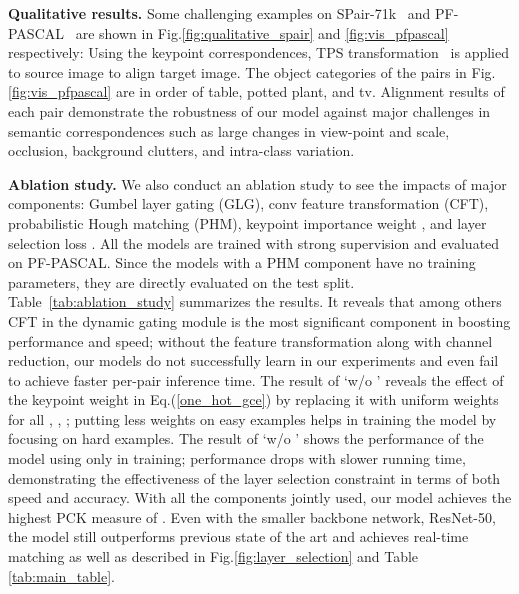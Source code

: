 \documentclass[runningheads]{llncs}
\begin{document}
\smallbreak
\noindent \textbf{Qualitative results.}
Some challenging examples on SPair-71k~\cite{min2019spair} and PF-PASCAL~\cite{ham2018proposal} are shown in Fig.\ref{fig:qualitative_spair} and \ref{fig:vis_pfpascal} respectively: Using the keypoint correspondences, TPS transformation~\cite{donato2002approximate} is applied to source image to align target image.
The object categories of the pairs in Fig.\ref{fig:vis_pfpascal} are in order of table, potted plant, and tv.
Alignment results of each pair demonstrate the robustness of our model against major challenges in semantic correspondences such as large changes in view-point and scale, occlusion, background clutters, and intra-class variation.

\smallbreak
\noindent \textbf{Ablation study.}
We also conduct an ablation study to see the impacts of major components: Gumbel layer gating (GLG), conv feature transformation (CFT), probabilistic Hough matching (PHM), keypoint importance weight , and layer selection loss .
All the models are trained with strong supervision and evaluated on PF-PASCAL. 
Since the models with a PHM component have no training parameters, they are directly evaluated on the test split.
Table~\ref{tab:ablation_study} summarizes the results. 
It reveals that among others CFT in the dynamic gating module is the most significant component in boosting performance and speed; without the feature transformation along with channel reduction, our models do not successfully learn in our experiments and even fail to achieve faster per-pair inference time.
The result of `w/o ' reveals the effect of the keypoint weight  in  Eq.(\ref{one_hot_gce}) by replacing it with uniform weights for all , \ie, ; putting less weights on easy examples helps in training the model by focusing on hard examples.
The result of `w/o ' shows the performance of the model using  only in training; performance drops with slower running time, demonstrating the effectiveness of the layer selection constraint in terms of both speed and accuracy.
With all the components jointly used, our model achieves the highest PCK measure of . Even with the smaller backbone network, ResNet-50, the model still outperforms previous state of the art and achieves real-time matching as well as described in Fig.\ref{fig:layer_selection} and Table \ref{tab:main_table}. 
\end{document}
